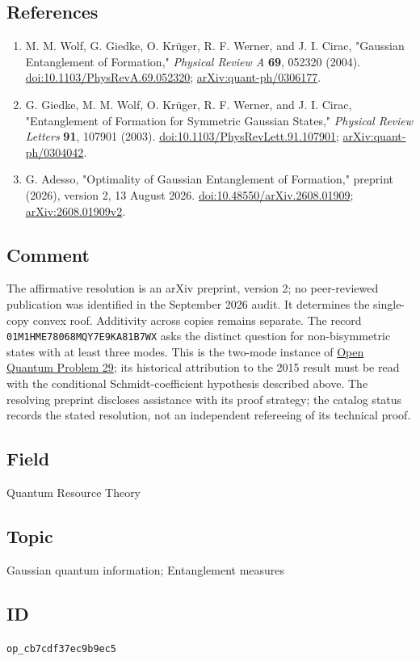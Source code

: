 \subsection*{References}

\begin{enumerate}[label={},leftmargin=4.8em,labelsep=0.5em]
  \footnotesize
  \item[\textup{[WGKWC04]}]\label{ref:ser10-1}
  M. M. Wolf, G. Giedke, O. Kr\"uger, R. F. Werner, and J. I. Cirac, "Gaussian Entanglement of Formation," \emph{Physical Review A} \textbf{69}, 052320 (2004). \href{https://doi.org/10.1103/PhysRevA.69.052320}{doi:10.1103/PhysRevA.69.052320}; \href{https://arxiv.org/abs/quant-ph/0306177}{arXiv:quant-ph/0306177}.

  \item[\textup{[GWKWC03]}]\label{ref:ser10-2}
  G. Giedke, M. M. Wolf, O. Kr\"uger, R. F. Werner, and J. I. Cirac, "Entanglement of Formation for Symmetric Gaussian States," \emph{Physical Review Letters} \textbf{91}, 107901 (2003). \href{https://doi.org/10.1103/PhysRevLett.91.107901}{doi:10.1103/PhysRevLett.91.107901}; \href{https://arxiv.org/abs/quant-ph/0304042}{arXiv:quant-ph/0304042}.

  \item[\textup{[Ade26]}]\label{ref:ser10-3}
  G. Adesso, "Optimality of Gaussian Entanglement of Formation," preprint (2026), version 2, 13 August 2026. \href{https://doi.org/10.48550/arXiv.2608.01909}{doi:10.48550/arXiv.2608.01909}; \href{https://arxiv.org/abs/2608.01909v2}{arXiv:2608.01909v2}.
\end{enumerate}

\subsection*{Comment}

The affirmative resolution is an arXiv preprint, version 2; no peer-reviewed publication was identified in the September 2026 audit. It determines the single-copy convex roof. Additivity across copies remains separate. The record \texttt{01M1HME78068MQY7E9KA81B7WX} asks the distinct question for non-bisymmetric states with at least three modes. This is the two-mode instance of \href{https://oqp.iqoqi.oeaw.ac.at/entanglement-of-formation-for-gaussian-states}{Open Quantum Problem 29}; its historical attribution to the 2015 result must be read with the conditional Schmidt-coefficient hypothesis described above. The resolving preprint discloses assistance with its proof strategy; the catalog status records the stated resolution, not an independent refereeing of its technical proof.

\subsection*{Field}

Quantum Resource Theory

\subsection*{Topic}

Gaussian quantum information; Entanglement measures

\subsection*{ID}

\texttt{op\_cb7cdf37ec9b9ec5}
